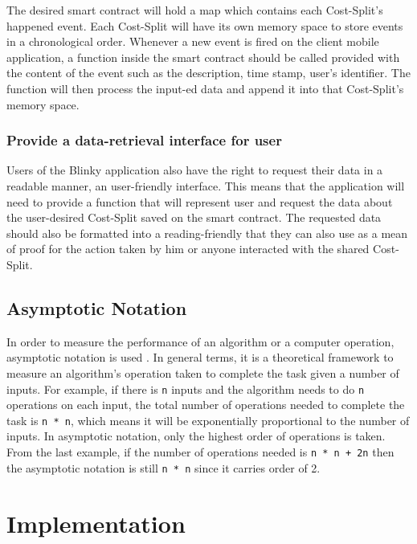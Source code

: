 \documentclass[twoside,numperchapter]{tutthesis} %
\begin{document}
The desired smart contract will hold a map which contains each Cost-Split's happened event. Each Cost-Split will have its own memory space to store events in a chronological order. Whenever a new event is fired on the client mobile application, a function inside the smart contract should be called provided with the content of the event such as the description, time stamp, user's identifier. The function will then process the input-ed data and append it into that Cost-Split's memory space.

\subsection{Provide a data-retrieval interface for user}

Users of the Blinky application also have the right to request their data in a readable manner, an user-friendly interface. This means that the application will need to provide a function that will represent user and request the data about the user-desired Cost-Split saved on the smart contract. The requested data should also be formatted into a reading-friendly that they can also use as a mean of proof for the action taken by him or anyone interacted with the shared Cost-Split.

\section{Asymptotic Notation}

In order to measure the performance of an algorithm or a computer operation, asymptotic notation is used \citep{AlgorithmAndDataStructure}. In general terms, it is a theoretical framework to measure an algorithm's operation taken to complete the task given a number of inputs. For example, if there is \texttt{n} inputs and the algorithm needs to do \texttt{n} operations on each input, the total number of operations needed to complete the task is \texttt{n * n}, which means it will be exponentially proportional to the number of inputs. In asymptotic notation, only the highest order of operations is taken. From the last example, if the number of operations needed is \texttt{n * n + 2n} then the asymptotic notation is still \texttt{n * n} since it carries order of 2.

\chapter{Implementation}
\label{ch:implementation}
\end{document}
